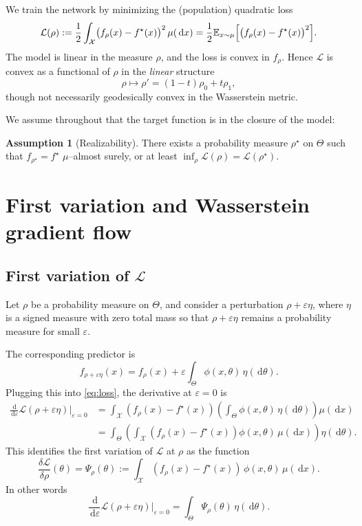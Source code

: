 \documentclass[11pt]{article}
\numberwithin{equation}{section}
\theoremstyle{definition}
\newtheorem{assumption}{Assumption}[section]
\newcommand{\dd}{\,\mathrm{d}}
\newcommand{\E}{\mathbb{E}}
\newcommand{\1}{\mathbbm{1}}
\begin{document}
We train the network by minimizing the (population) quadratic loss
\begin{equation}
\label{eq:loss}
\mathcal{L}(\rho)
:= \frac{1}{2}\int_{\mathcal{X}} \bigl(f_\rho(x)-f^\star(x)\bigr)^2\,\mu(\dd x)
= \frac{1}{2}\E_{x\sim \mu}\Bigl[\bigl(f_\rho(x)-f^\star(x)\bigr)^2\Bigr].
\end{equation}
The model is linear in the measure $\rho$, and the loss is convex in $f_\rho$. Hence $\mathcal{L}$ is convex as a functional of $\rho$ in the \emph{linear} structure
\[
\rho\mapsto \rho'=(1-t)\rho_0+t\rho_1,
\]
though not necessarily geodesically convex in the Wasserstein metric.

We assume throughout that the target function is in the closure of the model:
\begin{assumption}[Realizability]
\label{ass:realizable}
There exists a probability measure $\rho^\star$ on $\Theta$ such that $f_{\rho^\star}=f^\star$ $\mu$--almost surely, or at least $\inf_\rho \mathcal{L}(\rho)=\mathcal{L}(\rho^\star)$.
\end{assumption}

\section{First variation and Wasserstein gradient flow}

\subsection{First variation of $\mathcal{L}$}

Let $\rho$ be a probability measure on $\Theta$, and consider a perturbation $\rho+\varepsilon\eta$, where $\eta$ is a signed measure with zero total mass so that $\rho+\varepsilon\eta$ remains a probability measure for small $\varepsilon$.

The corresponding predictor is
\[
f_{\rho+\varepsilon\eta}(x)
= f_\rho(x) + \varepsilon \int_\Theta \phi(x,\theta)\,\eta(\dd\theta).
\]
Plugging this into \eqref{eq:loss}, the derivative at $\varepsilon=0$ is
\begin{align}
\frac{\dd}{\dd\varepsilon}\mathcal{L}(\rho+\varepsilon\eta)\bigg|_{\varepsilon=0}
&= \int_{\mathcal{X}} (f_\rho(x)-f^\star(x))
\left(\int_\Theta \phi(x,\theta)\,\eta(\dd\theta)\right)\mu(\dd x) \\
&= \int_\Theta \left(
\int_{\mathcal{X}} (f_\rho(x)-f^\star(x))\phi(x,\theta)\,\mu(\dd x)
\right)\eta(\dd\theta).
\end{align}
This identifies the first variation of $\mathcal{L}$ at $\rho$ as the function
\begin{equation}
\label{eq:first-variation}
\frac{\delta \mathcal{L}}{\delta\rho}(\theta)
= \Psi_\rho(\theta)
:= \int_{\mathcal{X}} (f_\rho(x)-f^\star(x))\,\phi(x,\theta)\,\mu(\dd x).
\end{equation}
In other words
\[
\frac{\dd}{\dd\varepsilon}\mathcal{L}(\rho+\varepsilon\eta)\bigg|_{\varepsilon=0}
= \int_\Theta \Psi_\rho(\theta)\,\eta(\dd\theta).
\]
\end{document}
